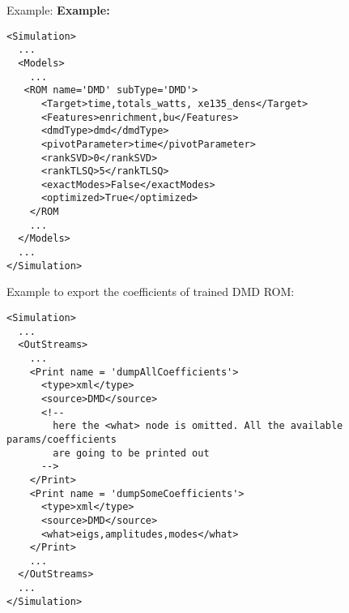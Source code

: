 \hspace{24pt}
Example:
\textbf{Example:}
\begin{lstlisting}[style=XML,morekeywords={name,subType}]
<Simulation>
  ...
  <Models>
    ...
   <ROM name='DMD' subType='DMD'>
      <Target>time,totals_watts, xe135_dens</Target>
      <Features>enrichment,bu</Features>
      <dmdType>dmd</dmdType>
      <pivotParameter>time</pivotParameter>
      <rankSVD>0</rankSVD>
      <rankTLSQ>5</rankTLSQ>
      <exactModes>False</exactModes>
      <optimized>True</optimized>
    </ROM
    ...
  </Models>
  ...
</Simulation>
\end{lstlisting}

Example to export the coefficients of trained DMD ROM:
\begin{lstlisting}[style=XML,morekeywords={name,subType}]
<Simulation>
  ...
  <OutStreams>
    ...
    <Print name = 'dumpAllCoefficients'>
      <type>xml</type>
      <source>DMD</source>
      <!--
        here the <what> node is omitted. All the available params/coefficients
        are going to be printed out
      -->
    </Print>
    <Print name = 'dumpSomeCoefficients'>
      <type>xml</type>
      <source>DMD</source>
      <what>eigs,amplitudes,modes</what>
    </Print>
    ...
  </OutStreams>
  ...
</Simulation>
\end{lstlisting}


